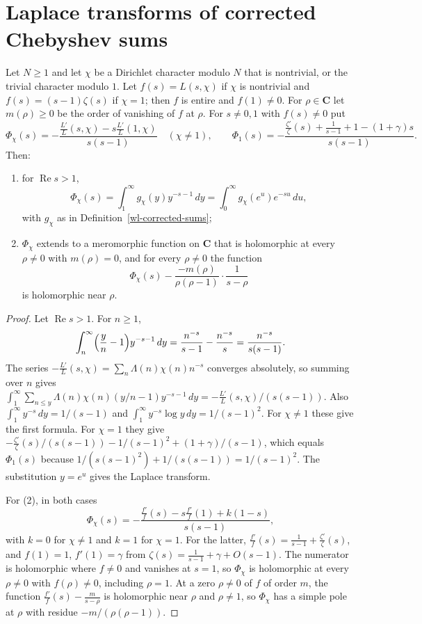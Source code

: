 \section{Laplace transforms of corrected Chebyshev sums}\label{section-wl-laplace}

\begin{lemma}\label{wl-laplace-character}
Let $N\geq1$ and let $\chi$ be a Dirichlet character modulo $N$ that is
nontrivial, or the trivial character modulo $1$. Let $f(s)=L(s,\chi)$ if
$\chi$ is nontrivial and $f(s)=(s-1)\zeta(s)$ if $\chi=1$; then $f$ is entire
and $f(1)\neq0$. For $\rho\in\mathbf C$ let $m(\rho)\geq0$ be the order of
vanishing of $f$ at $\rho$. For $s\neq0,1$ with $f(s)\neq0$ put
\[
 \Phi_\chi(s)=-\frac{\frac{L'}{L}(s,\chi)-s\frac{L'}{L}(1,\chi)}{s(s-1)}
 \quad(\chi\neq1),\qquad
 \Phi_1(s)=-\frac{\frac{\zeta'}{\zeta}(s)+\frac1{s-1}+1-(1+\gamma)s}{s(s-1)}.
\]
Then:
\begin{enumerate}
\item for $\operatorname{Re}s>1$,
  \[
   \Phi_\chi(s)=\int_1^\infty g_\chi(y)y^{-s-1}\,dy
   =\int_0^\infty g_\chi(e^u)e^{-su}\,du,
  \]
  with $g_\chi$ as in Definition~\ref{wl-corrected-sums};
\item $\Phi_\chi$ extends to a meromorphic function on $\mathbf C$ that is
  holomorphic at every $\rho\neq0$ with $m(\rho)=0$, and for every $\rho\neq0$
  the function
  \[
   \Phi_\chi(s)-\frac{-m(\rho)}{\rho(\rho-1)}\cdot\frac1{s-\rho}
  \]
  is holomorphic near $\rho$.
\end{enumerate}
\end{lemma}
\begin{proof}
Let $\operatorname{Re}s>1$. For $n\geq1$,
\[
 \int_n^\infty\Bigl(\frac yn-1\Bigr)y^{-s-1}\,dy=\frac{n^{-s}}{s-1}-\frac{n^{-s}}{s}
 =\frac{n^{-s}}{s(s-1)}.
\]
The series $-\frac{L'}{L}(s,\chi)=\sum_n\Lambda(n)\chi(n)n^{-s}$ converges
absolutely, so summing over $n$ gives
$\int_1^\infty\sum_{n\leq y}\Lambda(n)\chi(n)(y/n-1)y^{-s-1}\,dy
=-\frac{L'}{L}(s,\chi)/(s(s-1))$. Also $\int_1^\infty y^{-s}\,dy=1/(s-1)$ and
$\int_1^\infty y^{-s}\log y\,dy=1/(s-1)^2$. For $\chi\neq1$ these give the
first formula. For $\chi=1$ they give
$-\frac{\zeta'}{\zeta}(s)/(s(s-1))-1/(s-1)^2+(1+\gamma)/(s-1)$, which equals
$\Phi_1(s)$ because $1/(s(s-1)^2)+1/(s(s-1))=1/(s-1)^2$. The substitution
$y=e^u$ gives the Laplace transform.

For (2), in both cases
\[
 \Phi_\chi(s)=-\frac{\frac{f'}{f}(s)-s\frac{f'}{f}(1)+k(1-s)}{s(s-1)},
\]
with $k=0$ for $\chi\neq1$ and $k=1$ for $\chi=1$. For the latter,
$\frac{f'}{f}(s)=\frac1{s-1}+\frac{\zeta'}{\zeta}(s)$, and $f(1)=1$,
$f'(1)=\gamma$ from $\zeta(s)=\frac1{s-1}+\gamma+O(s-1)$. The numerator is
holomorphic where $f\neq0$ and vanishes at $s=1$, so $\Phi_\chi$ is
holomorphic at every $\rho\neq0$ with $f(\rho)\neq0$, including $\rho=1$. At
a zero $\rho\neq0$ of $f$ of order $m$, the function
$\frac{f'}{f}(s)-\frac m{s-\rho}$ is holomorphic near $\rho$ and $\rho\neq1$,
so $\Phi_\chi$ has a simple pole at $\rho$ with residue $-m/(\rho(\rho-1))$.
\end{proof}

